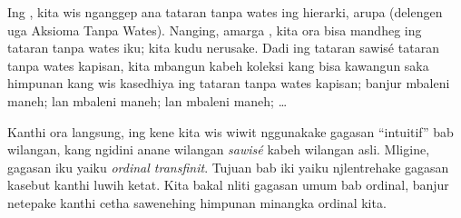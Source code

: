 \documentclass[../../../include/open-logic-section]{subfiles}
\begin{document}


Ing , kita wis nganggep ana tataran
tanpa wates ing hierarki, arupa \stagesinf{} (delengen
uga Aksioma Tanpa Wates). Nanging, amarga \stagessucc{},
kita ora bisa mandheg ing tataran tanpa wates iku;
kita kudu nerusake. Dadi ing tataran sawisé tataran
tanpa wates kapisan, kita mbangun kabeh koleksi
kang bisa kawangun saka himpunan kang wis kasedhiya
ing tataran tanpa wates kapisan; banjur mbaleni maneh;
lan mbaleni maneh; lan mbaleni maneh; \dots

Kanthi ora langsung, ing kene kita wis wiwit nggunakake
gagasan ``intuitif'' bab wilangan, kang ngidini anane
wilangan \emph{sawisé} kabeh wilangan asli. Mligine,
gagasan iku yaiku \emph{ordinal transfinit}. Tujuan
bab iki yaiku njlentrehake gagasan kasebut kanthi
luwih ketat. Kita bakal nliti gagasan umum bab ordinal,
banjur netepake kanthi cetha sawenehing himpunan
minangka ordinal kita.
\end{document}
